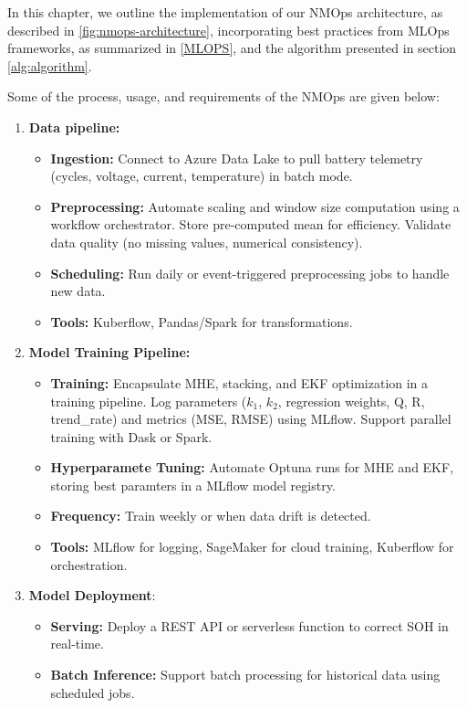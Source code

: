 In this chapter, we outline the implementation of our NMOps architecture, as described in \ref{fig:nmops-architecture}, incorporating best practices from MLOps frameworks, as summarized in \ref{MLOPS}, and the algorithm presented in section \ref{alg:algorithm}.

Some of the process, usage, and requirements of the NMOps are given below:
\begin{enumerate}
    \item \textbf{Data pipeline:}\begin{itemize}
        \item \textbf{Ingestion:} Connect to Azure Data Lake to pull battery telemetry (cycles, voltage, current, temperature) in batch mode.
        \item \textbf{Preprocessing:} Automate scaling and window size computation using a workflow orchestrator. Store pre-computed mean for efficiency. Validate data quality (no missing values, numerical consistency).
        \item \textbf{Scheduling:} Run daily or event-triggered preprocessing jobs to handle new data.
        \item \textbf{Tools:} Kuberflow, Pandas/Spark for transformations.
    \end{itemize}
    \item \textbf{Model Training Pipeline:} \begin{itemize}
        \item \textbf{Training:} Encapsulate MHE, stacking, and EKF optimization in a training pipeline. Log parameters ($k_1$, $k_2$, regression weights, Q, R, trend\_rate) and metrics (MSE, RMSE) using MLflow. Support parallel training with Dask or Spark.
        \item \textbf{Hyperparamete Tuning:} Automate Optuna runs for MHE and EKF, storing best paramters in a MLflow model registry.
        \item \textbf{Frequency:} Train weekly or when data drift is detected. 
        \item \textbf{Tools:} MLflow for logging, SageMaker for cloud training, Kuberflow for orchestration.
    \end{itemize}
    \item \textbf{Model Deployment}: \begin{itemize}
        \item \textbf{Serving:} Deploy a REST API or serverless function to correct SOH in real-time.
        \item \textbf{Batch Inference:} Support batch processing for historical data using scheduled jobs.

\end{itemize}
\end{enumerate}
